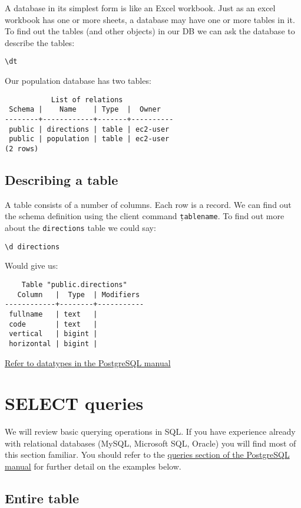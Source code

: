 \documentclass{pgnotes}
\begin{document}
A database in its simplest form is like an Excel workbook.
Just as an excel workbook has one or more sheets, a database may have one or more tables in it. 
To find out the tables (and other objects) in our DB we can ask the database to describe the tables:
\begin{verbatim}
\dt
\end{verbatim}
Our population database has two tables:
\begin{verbatim}
           List of relations
 Schema |    Name    | Type  |  Owner   
--------+------------+-------+----------
 public | directions | table | ec2-user
 public | population | table | ec2-user
(2 rows)
\end{verbatim}

\subsection{Describing a table}

A table consists of a number of columns.
Each row is a record.
We can find out the schema definition using the client command \texttt{\d tablename}.
To find out more about the \texttt{directions} table we could say:
\begin{verbatim}
\d directions
\end{verbatim}
Would give us:
\begin{verbatim}
    Table "public.directions"
   Column   |  Type  | Modifiers 
------------+--------+-----------
 fullname   | text   | 
 code       | text   | 
 vertical   | bigint | 
 horizontal | bigint | 
\end{verbatim}

\href{https://www.postgresql.org/docs/13/datatype.html}{Refer to datatypes in the PostgreSQL manual}

\section{SELECT queries}

We will review basic querying operations in SQL. 
If you have experience already with relational databases (MySQL, Microsoft SQL, Oracle) you will find most of this section familiar.
You should refer to the \href{https://www.postgresql.org/docs/13/queries.html}{queries section of the PostgreSQL manual} for further detail on the examples below.

\subsection{Entire table}
\end{document}

